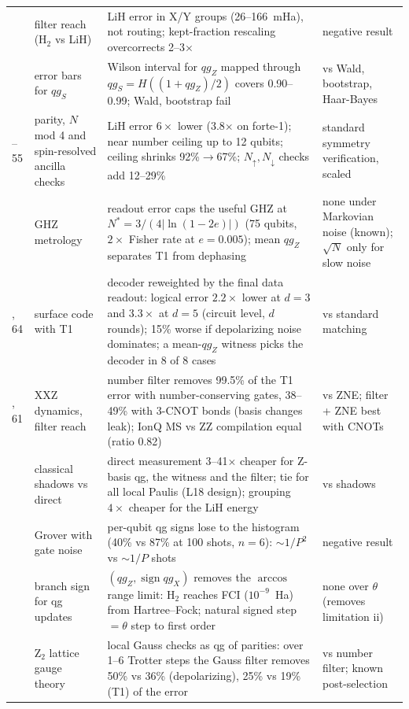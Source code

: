\documentclass[11pt]{article}
\newcommand{\qgZ}{qg_Z}
\newcommand{\qgS}{qg_S}
\begin{document}
{\begin{longtable}{>{\raggedright\arraybackslash}p{0.9cm}>{\raggedright\arraybackslash}p{4.0cm}>{\raggedright\arraybackslash}p{5.8cm}>{\raggedright\arraybackslash}p{3.2cm}}
50 & filter reach (H$_2$ vs LiH) & LiH error in X/Y groups (26--166~mHa), not routing; kept-fraction rescaling overcorrects 2--3$\times$ & negative result \\
51 & error bars for $\qgS$ & Wilson interval for $\qgZ$ mapped through $\qgS=H((1+\qgZ)/2)$ covers 0.90--0.99; Wald, bootstrap fail & vs Wald, bootstrap, Haar-Bayes \\
52--55 & parity, $N$ mod 4 and spin-resolved ancilla checks & LiH error $6\times$ lower (3.8$\times$ on forte-1); near number ceiling up to 12 qubits; ceiling shrinks 92\%$\to$67\%; $N_\uparrow,N_\downarrow$ checks add 12--29\% & standard symmetry verification, scaled \\
58 & GHZ metrology & readout error caps the useful GHZ at $N^*=3/(4|\ln(1-2e)|)$ (75 qubits, $2\times$ Fisher rate at $e=0.005$); mean $\qgZ$ separates T1 from dephasing & none under Markovian noise (known); $\sqrt{N}$ only for slow noise \\
59, 64 & surface code with T1 & decoder reweighted by the final data readout: logical error $2.2\times$ lower at $d=3$ and $3.3\times$ at $d=5$ (circuit level, $d$ rounds); 15\% worse if depolarizing noise dominates; a mean-$\qgZ$ witness picks the decoder in 8 of 8 cases & vs standard matching \\
60, 61 & XXZ dynamics, filter reach & number filter removes 99.5\% of the T1 error with number-conserving gates, 38--49\% with 3-CNOT bonds (basis changes leak); IonQ MS vs ZZ compilation equal (ratio 0.82) & vs ZNE; filter + ZNE best with CNOTs \\
62 & classical shadows vs direct & direct measurement 3--41$\times$ cheaper for Z-basis qg, the witness and the filter; tie for all local Paulis (L18 design); grouping $4\times$ cheaper for the LiH energy & vs shadows~\cite{huang2020} \\
63 & Grover with gate noise & per-qubit qg signs lose to the histogram (40\% vs 87\% at 100 shots, $n=6$): $\sim1/P^2$ vs $\sim1/P$ shots & negative result \\
65 & branch sign for qg updates & $(\qgZ,\operatorname{sign}qg_X)$ removes the $\arccos$ range limit: H$_2$ reaches FCI ($10^{-9}$~Ha) from Hartree--Fock; natural signed step $=\theta$ step to first order & none over $\theta$ (removes limitation ii) \\
66 & Z$_2$ lattice gauge theory & local Gauss checks as qg of parities: over 1--6 Trotter steps the Gauss filter removes 50\% vs 36\% (depolarizing), 25\% vs 19\% (T1) of the error & vs number filter; known post-selection \\

\end{longtable}}
\end{document}
